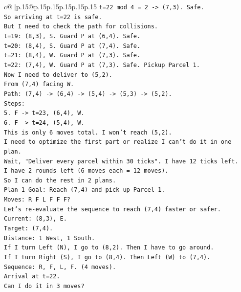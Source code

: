 \documentclass{article}
\begin{document}
{\begin{supertabular}{c@{$\;$}|p{.15\linewidth}@{}p{.15\linewidth}p{.15\linewidth}p{.15\linewidth}p{.15\linewidth}p{.15\linewidth}}
{{{\texttt{t=22 mod 4 = 2 {-}> (7,3). Safe.} \\
\texttt{So arriving at t=22 is safe.} \\
\texttt{But I need to check the path for collisions.} \\
\texttt{t=19: (8,3), S. Guard P at (6,4). Safe.} \\
\texttt{t=20: (8,4), S. Guard P at (7,4). Safe.} \\
\texttt{t=21: (8,4), W. Guard P at (7,3). Safe.} \\
\texttt{t=22: (7,4), W. Guard P at (7,3). Safe. Pickup Parcel 1.} \\
\texttt{Now I need to deliver to (5,2).} \\
\texttt{From (7,4) facing W.} \\
\texttt{Path: (7,4) {-}> (6,4) {-}> (5,4) {-}> (5,3) {-}> (5,2).} \\
\texttt{Steps:} \\
\texttt{5. F {-}> t=23, (6,4), W.} \\
\texttt{6. F {-}> t=24, (5,4), W.} \\
\texttt{This is only 6 moves total. I won't reach (5,2).} \\
\texttt{I need to optimize the first part or realize I can't do it in one plan.} \\
\texttt{Wait, "Deliver every parcel within 30 ticks". I have 12 ticks left.} \\
\texttt{I have 2 rounds left (6 moves each = 12 moves).} \\
\texttt{So I can do the rest in 2 plans.} \\
\texttt{Plan 1 Goal: Reach (7,4) and pick up Parcel 1.} \\
\texttt{Moves: R F L F F F?} \\
\texttt{Let's re{-}evaluate the sequence to reach (7,4) faster or safer.} \\
\texttt{Current: (8,3), E.} \\
\texttt{Target: (7,4).} \\
\texttt{Distance: 1 West, 1 South.} \\
\texttt{If I turn Left (N), I go to (8,2). Then I have to go around.} \\
\texttt{If I turn Right (S), I go to (8,4). Then Left (W) to (7,4).} \\
\texttt{Sequence: R, F, L, F. (4 moves).} \\
\texttt{Arrival at t=22.} \\
\texttt{Can I do it in 3 moves?} \\
}}}
\end{supertabular}}
\end{document}
